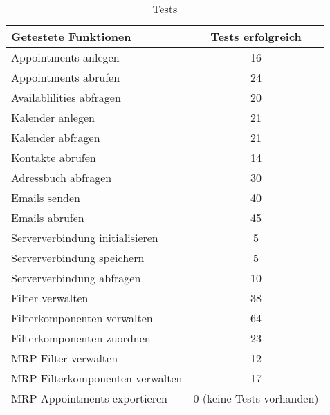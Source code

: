 \begin{table}[H]
\centering
\begin{tabular}{|l|c|}
\hline
Getestete Funktionen&Tests erfolgreich\\ \hline
Appointments anlegen& 16\\ \hline
Appointments abrufen& 24\\ \hline
Availablilities abfragen&20\\ \hline
Kalender anlegen&21\\ \hline
Kalender abfragen&21\\ \hline
Kontakte abrufen&14\\ \hline
Adressbuch abfragen&30\\ \hline
Emails senden     &40\\ \hline
Emails abrufen     &45\\ \hline
Serververbindung initialisieren& 5\\ \hline
Serververbindung speichern & 5 \\ \hline
Serververbindung abfragen     &    10    \\ \hline

Filter verwalten     &       38 \\ \hline
Filterkomponenten verwalten     &    64    \\ \hline
Filterkomponenten zuordnen     &    23    \\ \hline
MRP-Filter verwalten     &   12     \\ \hline
MRP-Filterkomponenten verwalten     &       17 \\ \hline
MRP-Appointments exportieren & 0 (keine Tests vorhanden) \\ \hline
\end{tabular}
\caption{Tests}
\end{table}

